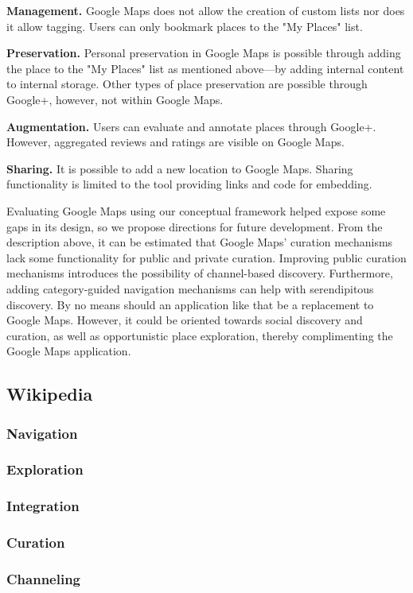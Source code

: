 {{\textbf{Management.} Google Maps does not allow the creation of custom lists nor does it allow tagging. Users can only bookmark places to the "My Places" list. 

\textbf{Preservation.} Personal preservation in Google Maps is possible through adding the place to the "My Places" list as mentioned above---by adding internal content to internal storage. Other types of place preservation are possible through Google+, however, not within Google Maps.

\textbf{Augmentation.} Users can evaluate and annotate places through Google+. However, aggregated reviews and ratings are visible on Google Maps. 

\textbf{Sharing.} It is possible to add a new location to Google Maps. Sharing functionality is limited to the tool providing links and code for embedding.  

Evaluating Google Maps using our conceptual framework helped expose some gaps in its design, so we propose directions for future development. From the description above, it can be estimated that Google Maps' curation mechanisms lack some functionality for public and private curation. Improving public curation mechanisms introduces the possibility of channel-based discovery. Furthermore, adding category-guided navigation mechanisms can help with serendipitous discovery. By no means should an application like that be a replacement to Google Maps. However, it could be oriented towards social discovery and curation, as well as opportunistic place exploration, thereby complimenting the Google Maps application.  

} %




{\subsection{Wikipedia}
{\subsubsection{Navigation}}
{\subsubsection{Exploration}}
{\subsubsection{Integration}}
{\subsubsection{Curation}}
{\subsubsection{Channeling}}
} %


}

